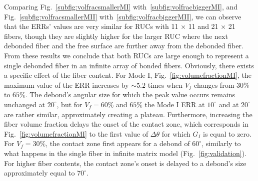 \documentclass[review]{elsarticle}
\begin{document}
Comparing Fig.~\ref{subfig:volfracsmallerMI} with~\ref{subfig:volfracbiggerMI}, and Fig.~\ref{subfig:volfracsmallerMII} with~\ref{subfig:volfracbiggerMII}, we can observe that the ERRs' values are very similar for RUCs with 11 × 11 and 21 × 21 fibers, though they are slightly higher for the larger RUC where the next debonded fiber and the free surface are further away from the debonded fiber. From these results we conclude that both RUCs are large enough to represent a single debonded fiber in an infinite array of bonded fibers. Obviously, there exists a specific effect of the fiber content. For Mode I, Fig.~\ref{fig:volumefractionMI}, the maximum value of the ERR increases by $\sim 5.2$ times when $V_{f}$ changes from $30\%$ to $65\%$. The debond's angular size for which the peak value occurs remains unchanged at $20^{\circ}$, but for $V_{f}=60\%$ and $65\%$ the Mode I ERR at $10^{\circ}$ and at $20^{\circ}$ are rather similar, approximately creating a plateau. Furthermore, increasing the fiber volume fraction delays the onset of the contact zone, which corresponds in Fig.~\ref{fig:volumefractionMI} to the first value of $\Delta\theta$ for which $G_{I}$ is equal to zero. For $V_{f}=30\%$, the contact zone first appears for a debond of $60^{\circ}$, similarly to what happens in the single fiber in infinite matrix model (Fig.~\ref{fig:validation}). For higher fiber contents, the contact zone's onset is delayed to a debond's size approximately equal to $70^{\circ}$.
\end{document}
